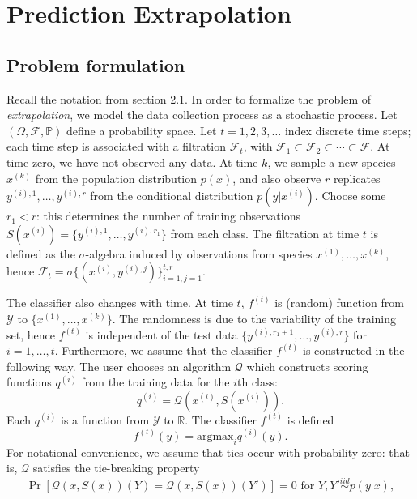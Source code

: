 \documentclass{article}
\newcommand{\argmax}{\text{argmax}}
\begin{document}
\section{Prediction Extrapolation}

\subsection{Problem formulation}

Recall the notation from section 2.1. In order to formalize the problem of \emph{extrapolation}, we model
the data collection process as a stochastic process.  Let $(\Omega,
\mathcal{F}, \mathbb{P})$ define a probability space.  Let $t = 1, 2,
3, \hdots $ index discrete time steps; each time step is associated
with a filtration $\mathcal{F}_t$, with $\mathcal{F}_1 \subset
\mathcal{F}_2 \subset \cdots \subset \mathcal{F}$.  At time zero, we
have not observed any data.  At time $k$, we sample a new species
$x^{(k)}$ from the population distribution $p(x)$, and also observe
$r$ replicates $y^{(i), 1}, \hdots, y^{(i), r}$ from the conditional
distribution $p(y|x^{(i)})$.  Choose some $r_1 < r$: this determines
the number of training observations $S(x^{(i)}) = \{y^{(i), 1},\hdots,
y^{(i), r_1}\}$ from each class.  The filtration at time $t$ is
defined as the $\sigma$-algebra induced by observations from species
$x^{(1)}, \hdots, x^{(k)}$, hence $\mathcal{F}_t = \sigma\{(x^{(i)},
y^{(i), j})\}_{i=1, j=1}^{t, r}$.

The classifier also changes with time.  At time $t$, $f^{(t)}$ is
(random) function from $\mathcal{Y}$ to $\{x^{(1)}, \hdots,
x^{(k)}\}$.  The randomness is due to the variability of the training
set, hence $f^{(t)}$ is independent of the test data $\{y^{(i), r_1 +
  1}, \hdots, y^{(i), r}\}$ for $i = 1,\hdots, t$.  Furthermore, we
assume that the classifier $f^{(t)}$ is constructed in the following
way.  The user chooses an algorithm $\mathcal{Q}$ which constructs
scoring functions $q^{(i)}$ from the training data for the $i$th
class:
\[
q^{(i)} = \mathcal{Q}(x^{(i)}, S(x^{(i)})).
\]
Each $q^{(i)}$ is a function from $\mathcal{Y}$ to $\mathbb{R}$.  The
classifier $f^{(t)}$ is defined
\[
f^{(t)}(y) = \argmax_i q^{(i)}(y).
\]
For notational convenience, we assume that ties occur with probability zero: that is, $\mathcal{Q}$ satisfies the tie-breaking property
\begin{equation}\label{eq:tie}
\Pr[\mathcal{Q}(x, S(x))(Y) = \mathcal{Q}(x, S(x))(Y')] = 0\text{ for }Y, Y' \stackrel{iid}{\sim} p(y|x),
\end{equation}
\end{document}
